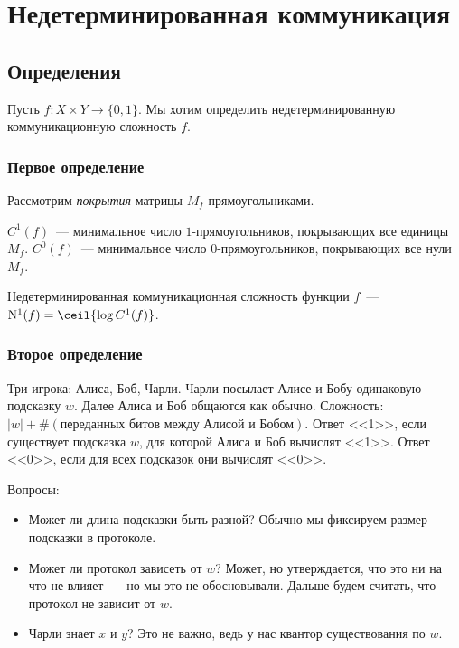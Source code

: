 \section{Недетерминированная коммуникация}

\subsection{Определения}

Пусть $f\colon X\times Y\to \{0, 1\}$. Мы хотим определить недетерминированную коммуникационную сложность
$f$.

\subsubsection{Первое определение}
Рассмотрим \emph{покрытия} матрицы $M_f$ прямоугольниками.

\begin{definition}
    $C^1(f)$~--- минимальное число $1$-прямоугольников, покрывающих все единицы $M_f$. $C^0(f)$~---
    минимальное число 0-прямоугольников, покрывающих все нули $M_f$.

    Недетерминированная коммуникационная сложность функции $f$~--- $\NCC{1}(f) = \ceil{\log C^1(f)}$.
\end{definition}

\subsubsection{Второе определение}
Три игрока: Алиса, Боб, Чарли. Чарли посылает Алисе и Бобу одинаковую подсказку $w$. Далее Алиса и Боб
общаются как обычно. Сложность: $|w| + \#(\text{переданных битов между Алисой и Бобом})$. Ответ <<1>>,
если существует подсказка $w$, для которой Алиса и Боб вычислят <<1>>. Ответ <<0>>, если для всех
подсказок они вычислят <<0>>.

Вопросы:
\begin{itemize}
    \item Может ли длина подсказки быть разной? Обычно мы фиксируем размер подсказки в протоколе.
    \item Может ли протокол зависеть от $w$? Может, но утверждается, что это ни на что не влияет~--- но
        мы это не обосновывали. Дальше будем считать, что протокол не зависит от $w$.
    \item Чарли знает $x$ и $y$? Это не важно, ведь у нас квантор существования по $w$.
\end{itemize}

